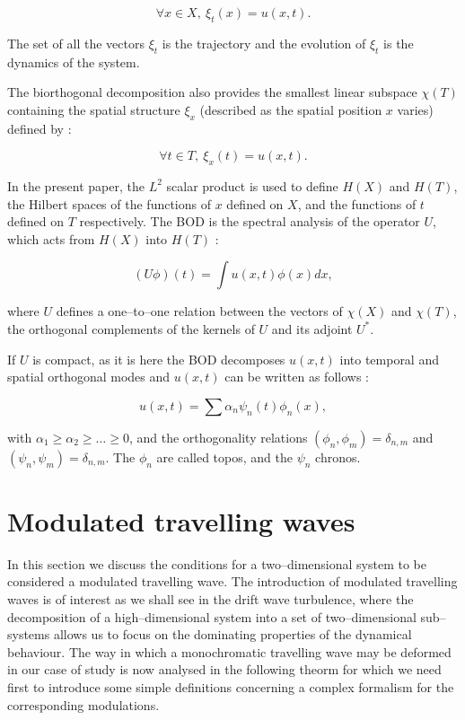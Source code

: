 \begin{equation}
\forall x \in X,\ \xi_t(x)=u(x,t).
\end{equation}

The set of all the vectors $\xi_t$ is the trajectory 
and the evolution of $\xi_t$ is the dynamics of the system.

\medskip

The biorthogonal decomposition also provides the smallest 
linear subspace $\chi(T)$ containing the spatial structure $\xi_x$
 (described as the spatial position $x$ varies) defined by :

\begin{equation}
\forall t \in T,\ \xi_x(t)=u(x,t).
\end{equation}

In the present paper, the $L^2$ scalar product is used to
define $H(X)$ and $H(T)$, the Hilbert spaces of the 
functions of $x$ defined on $X$, and 
the functions of $t$ defined on $T$ respectively.
The BOD is the spectral analysis of the operator $U$, 
which acts from $H(X)$ into $H(T)$ :

\begin{equation}
(U\phi)(t)=\int u(x,t)\phi(x) dx,
\end{equation}

where $U$ defines a one--to--one relation between the 
vectors of $\chi(X)$ and $\chi(T)$, the orthogonal complements of the 
kernels of $U$ and its adjoint $U^*$.

\medskip

If $U$ is compact, as it is here  
the BOD decomposes $u(x,t)$ into temporal  and 
spatial orthogonal modes and $u(x,t)$ can be written as follows :

\begin{equation}
u(x,t)=\sum \alpha_n \psi_n(t)\phi_n(x),
\end{equation}

with $\alpha_1\geq\alpha_2\geq\dots\geq 0$, and the orthogonality
 relations $(\phi_n,\phi_m)=\delta_{n,m}$ and 
$(\psi_n,\psi_m)=\delta_{n,m}$. The $\phi_n$ are called topos,
 and the $\psi_n$ chronos.






\section{Modulated travelling waves}\label{moduldef}

In this section we discuss the conditions for
a two--dimensional system to be considered a modulated 
travelling wave. 
The introduction of modulated travelling waves is of interest 
as we shall see in the drift wave turbulence, where
the decomposition of a high--dimensional system into a set of 
two--dimensional sub--systems allows us to 
focus on the dominating properties of the dynamical behaviour.
The way in which a monochromatic travelling wave may be deformed
in our case of study is now analysed in the following theorm for 
which we need first to introduce some simple definitions concerning
a complex formalism for the corresponding modulations.

